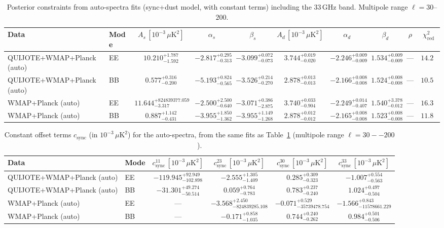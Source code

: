 \begin{table}[h]
\centering
\scriptsize
\setlength{\tabcolsep}{4pt}
\caption{Posterior constraints from auto-spectra fits (sync+dust model, with constant terms) including the 33\,GHz band. Multipole range $\ell=30$--$200$.}
\label{tab:fit_results_auto_with33_sync_dust}
\begin{tabular}{llcccccccc}
\toprule
Data & Mode & $A_s\,[10^{-3}\,\mu\mathrm{K}^2]$ & $\alpha_s$ & $\beta_s$ & $A_d\,[10^{-3}\,\mu\mathrm{K}^2]$ & $\alpha_d$ & $\beta_d$ & $\rho$ & $\chi^2_\mathrm{red}$ \\
\midrule
QUIJOTE+WMAP+Planck (auto) & EE & $10.210^{+1.787}_{-1.592}$ & $-2.817^{+0.295}_{-0.313}$ & $-3.099^{+0.072}_{-0.073}$ & $3.744^{+0.019}_{-0.020}$ & $-2.246^{+0.009}_{-0.009}$ & $1.534^{+0.009}_{-0.009}$ & --- & $14.29$ \\
QUIJOTE+WMAP+Planck (auto) & BB & $0.577^{+0.316}_{-0.200}$ & $-5.193^{+0.824}_{-0.565}$ & $-3.526^{+0.214}_{-0.270}$ & $2.878^{+0.013}_{-0.013}$ & $-2.166^{+0.008}_{-0.008}$ & $1.524^{+0.008}_{-0.008}$ & --- & $10.53$ \\
WMAP+Planck (auto) & EE & $11.644^{+824839377.059}_{-3.317}$ & $-2.500^{+2.500}_{-0.640}$ & $-3.071^{+0.386}_{-2.875}$ & $3.740^{+0.033}_{-0.904}$ & $-2.249^{+0.014}_{-0.407}$ & $1.540^{+3.378}_{-0.012}$ & --- & $16.39$ \\
WMAP+Planck (auto) & BB & $0.887^{+1.142}_{-0.431}$ & $-3.955^{+1.850}_{-1.362}$ & $-3.955^{+1.149}_{-1.268}$ & $2.878^{+0.012}_{-0.012}$ & $-2.165^{+0.008}_{-0.008}$ & $1.523^{+0.008}_{-0.008}$ & --- & $11.88$ \\
\bottomrule
\end{tabular}
\end{table}

\begin{table}[h]
\centering
\scriptsize
\setlength{\tabcolsep}{4pt}
\caption{Constant offset terms $c_{\mathrm{sync}}$ (in $10^{-3}\,\mu\mathrm{K}^2$) for the auto-spectra, from the same fits as Table~\ref{tab:fit_results_auto_with33_sync_dust} (multipole range $\ell=30--200$).}
\label{tab:fit_results_auto_with33_sync_dust_c_terms}
\begin{tabular}{llcccc}
\toprule
Data & Mode & $c_{\mathrm{sync}}^{11}\,[10^{-3}\,\mu\mathrm{K}^2]$ & $c_{\mathrm{sync}}^{23}\,[10^{-3}\,\mu\mathrm{K}^2]$ & $c_{\mathrm{sync}}^{30}\,[10^{-3}\,\mu\mathrm{K}^2]$ & $c_{\mathrm{sync}}^{33}\,[10^{-3}\,\mu\mathrm{K}^2]$ \\
\midrule
QUIJOTE+WMAP+Planck (auto) & EE & $-119.945^{+92.949}_{-102.898}$ & $-2.555^{+1.305}_{-1.409}$ & $0.285^{+0.309}_{-0.323}$ & $-1.007^{+0.554}_{-0.563}$ \\
QUIJOTE+WMAP+Planck (auto) & BB & $-31.301^{+49.274}_{-50.514}$ & $0.059^{+0.764}_{-0.783}$ & $0.783^{+0.237}_{-0.240}$ & $1.024^{+0.497}_{-0.504}$ \\
WMAP+Planck (auto) & EE & --- & $-3.568^{+2.450}_{-824839285.108}$ & $-0.071^{+0.529}_{-35739478.754}$ & $-1.566^{+0.843}_{-11578661.229}$ \\
WMAP+Planck (auto) & BB & --- & $-0.171^{+0.858}_{-1.035}$ & $0.744^{+0.240}_{-0.262}$ & $0.984^{+0.501}_{-0.506}$ \\
\bottomrule
\end{tabular}
\end{table}
